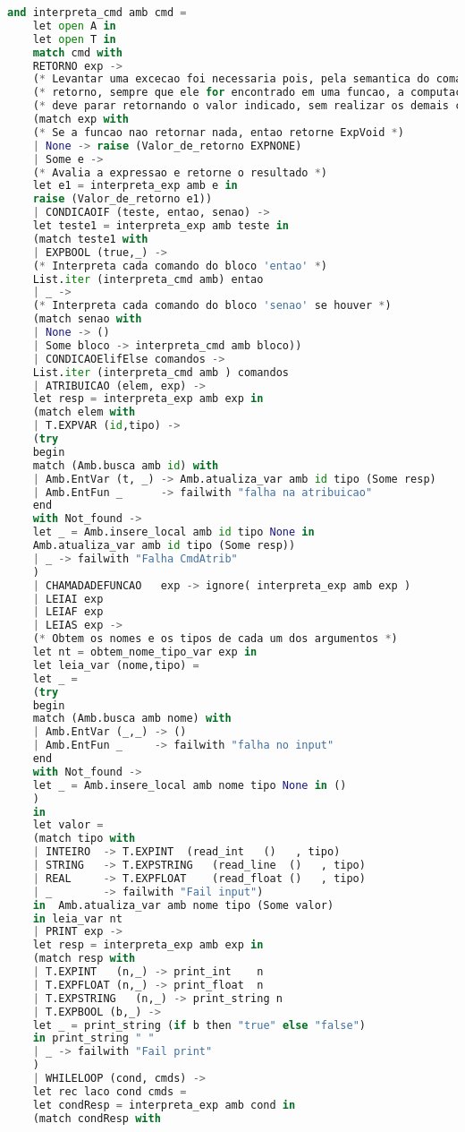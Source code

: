 \documentclass[hidelinks,12pt]{article}
\begin{document}
\begin{appendices}
\begin{lstlisting}[caption=interprete.mll, language=python]
	and interpreta_cmd amb cmd =
	let open A in
	let open T in
	match cmd with
	RETORNO exp ->
	(* Levantar uma excecao foi necessaria pois, pela semantica do comando de   *)
	(* retorno, sempre que ele for encontrado em uma funcao, a computacao       *)
	(* deve parar retornando o valor indicado, sem realizar os demais comandos. *)
	(match exp with
	(* Se a funcao nao retornar nada, entao retorne ExpVoid *)
	| None -> raise (Valor_de_retorno EXPNONE)
	| Some e ->
	(* Avalia a expressao e retorne o resultado *)
	let e1 = interpreta_exp amb e in
	raise (Valor_de_retorno e1))
	| CONDICAOIF (teste, entao, senao) ->
	let teste1 = interpreta_exp amb teste in
	(match teste1 with
	| EXPBOOL (true,_) ->
	(* Interpreta cada comando do bloco 'entao' *)
	List.iter (interpreta_cmd amb) entao
	| _ ->
	(* Interpreta cada comando do bloco 'senao' se houver *)
	(match senao with
	| None -> ()
	| Some bloco -> interpreta_cmd amb bloco))
	| CONDICAOElifElse comandos ->
	List.iter (interpreta_cmd amb ) comandos
	| ATRIBUICAO (elem, exp) ->
	let resp = interpreta_exp amb exp in       
	(match elem with
	| T.EXPVAR (id,tipo) ->
	(try
	begin 
	match (Amb.busca amb id) with
	| Amb.EntVar (t, _) -> Amb.atualiza_var amb id tipo (Some resp)
	| Amb.EntFun _      -> failwith "falha na atribuicao"
	end 
	with Not_found -> 
	let _ = Amb.insere_local amb id tipo None in 
	Amb.atualiza_var amb id tipo (Some resp))
	| _ -> failwith "Falha CmdAtrib"
	)
	| CHAMADADEFUNCAO   exp -> ignore( interpreta_exp amb exp )
	| LEIAI exp
	| LEIAF exp
	| LEIAS exp ->
	(* Obtem os nomes e os tipos de cada um dos argumentos *)
	let nt = obtem_nome_tipo_var exp in
	let leia_var (nome,tipo) =
	let _ = 
	(try
	begin 
	match (Amb.busca amb nome) with
	| Amb.EntVar (_,_) -> ()
	| Amb.EntFun _     -> failwith "falha no input"
	end 
	with Not_found -> 
	let _ = Amb.insere_local amb nome tipo None in ()
	)
	in
	let valor = 
	(match tipo with
	| INTEIRO  -> T.EXPINT  (read_int   ()   , tipo)
	| STRING   -> T.EXPSTRING   (read_line  ()   , tipo)
	| REAL     -> T.EXPFLOAT    (read_float ()   , tipo)
	| _        -> failwith "Fail input")
	in  Amb.atualiza_var amb nome tipo (Some valor)
	in leia_var nt
	| PRINT exp ->
	let resp = interpreta_exp amb exp in
	(match resp with
	| T.EXPINT   (n,_) -> print_int    n
	| T.EXPFLOAT (n,_) -> print_float  n
	| T.EXPSTRING   (n,_) -> print_string n
	| T.EXPBOOL (b,_) ->
	let _ = print_string (if b then "true" else "false")
	in print_string " "
	| _ -> failwith "Fail print"
	)
	| WHILELOOP (cond, cmds) -> 
	let rec laco cond cmds = 
	let condResp = interpreta_exp amb cond in
	(match condResp with

\end{lstlisting}
\end{appendices}
\end{document}
